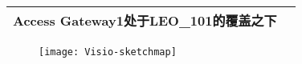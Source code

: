 
\begin{table}[htb]
\centering
{}
\label{dynamictopo:Tab:parasim}
\begin{tabular}{lp{4cm}p{4cm}p{4cm}}
\hline

\multicolumn{3}{l}{Access Gateway1处于LEO\_101的覆盖之下} \\

\hline
\end{tabular}
\end{table}



\begin{figure}[htbp]
\centering
\texttt{[image: Visio-sketchmap]}
\label{Figure:Tricks:Example1}
\end{figure}